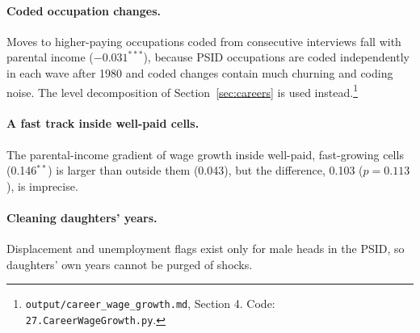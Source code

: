 \paragraph{Coded occupation changes.} Moves to higher-paying occupations coded from consecutive interviews fall with
parental income ($-0.031^{***}$), because PSID occupations are coded independently in each wave after 1980 and coded
changes contain much churning and coding noise. The level decomposition of Section~\ref{sec:careers} is used
instead.\footnote{\texttt{output/career\_wage\_growth.md}, Section 4. Code: \texttt{27.CareerWageGrowth.py}.}

\paragraph{A fast track inside well-paid cells.} The parental-income gradient of wage growth inside well-paid,
fast-growing cells (0.146$^{**}$) is larger than outside them (0.043), but the difference, 0.103 ($p=0.113$), is
imprecise.

\paragraph{Cleaning daughters' years.} Displacement and unemployment flags exist only for male heads in the PSID, so
daughters' own years cannot be purged of shocks.
